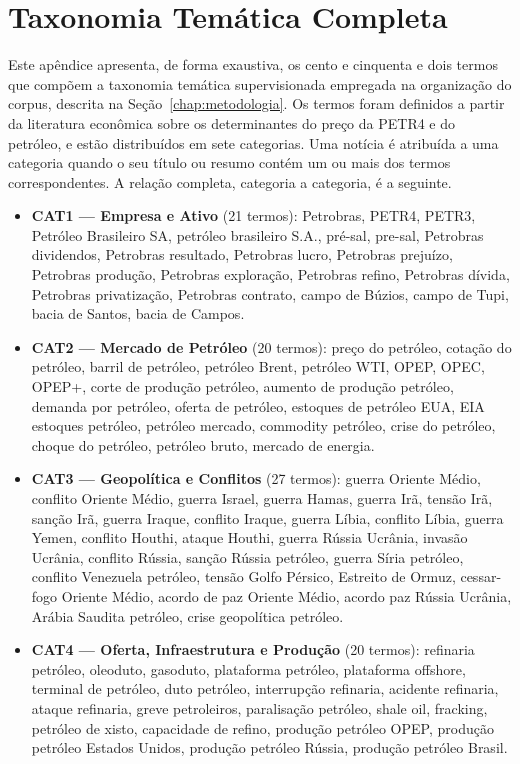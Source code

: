 \chapter{Taxonomia Temática Completa} \label{ap:taxonomia}

Este apêndice apresenta, de forma exaustiva, os cento e cinquenta e dois termos que compõem a taxonomia temática supervisionada empregada na organização do corpus, descrita na Seção~\ref{chap:metodologia}. Os termos foram definidos a partir da literatura econômica sobre os determinantes do preço da PETR4 e do petróleo, e estão distribuídos em sete categorias. Uma notícia é atribuída a uma categoria quando o seu título ou resumo contém um ou mais dos termos correspondentes. A relação completa, categoria a categoria, é a seguinte.

\begin{itemize}
\item \textbf{CAT1 — Empresa e Ativo} (21 termos): Petrobras, PETR4, PETR3, Petróleo Brasileiro SA, petróleo brasileiro S.A., pré-sal, pre-sal, Petrobras dividendos, Petrobras resultado, Petrobras lucro, Petrobras prejuízo, Petrobras produção, Petrobras exploração, Petrobras refino, Petrobras dívida, Petrobras privatização, Petrobras contrato, campo de Búzios, campo de Tupi, bacia de Santos, bacia de Campos.

\item \textbf{CAT2 — Mercado de Petróleo} (20 termos): preço do petróleo, cotação do petróleo, barril de petróleo, petróleo Brent, petróleo WTI, OPEP, OPEC, OPEP+, corte de produção petróleo, aumento de produção petróleo, demanda por petróleo, oferta de petróleo, estoques de petróleo EUA, EIA estoques petróleo, petróleo mercado, commodity petróleo, crise do petróleo, choque do petróleo, petróleo bruto, mercado de energia.

\item \textbf{CAT3 — Geopolítica e Conflitos} (27 termos): guerra Oriente Médio, conflito Oriente Médio, guerra Israel, guerra Hamas, guerra Irã, tensão Irã, sanção Irã, guerra Iraque, conflito Iraque, guerra Líbia, conflito Líbia, guerra Yemen, conflito Houthi, ataque Houthi, guerra Rússia Ucrânia, invasão Ucrânia, conflito Rússia, sanção Rússia petróleo, guerra Síria petróleo, conflito Venezuela petróleo, tensão Golfo Pérsico, Estreito de Ormuz, cessar-fogo Oriente Médio, acordo de paz Oriente Médio, acordo paz Rússia Ucrânia, Arábia Saudita petróleo, crise geopolítica petróleo.

\item \textbf{CAT4 — Oferta, Infraestrutura e Produção} (20 termos): refinaria petróleo, oleoduto, gasoduto, plataforma petróleo, plataforma offshore, terminal de petróleo, duto petróleo, interrupção refinaria, acidente refinaria, ataque refinaria, greve petroleiros, paralisação petróleo, shale oil, fracking, petróleo de xisto, capacidade de refino, produção petróleo OPEP, produção petróleo Estados Unidos, produção petróleo Rússia, produção petróleo Brasil.


\end{itemize}
